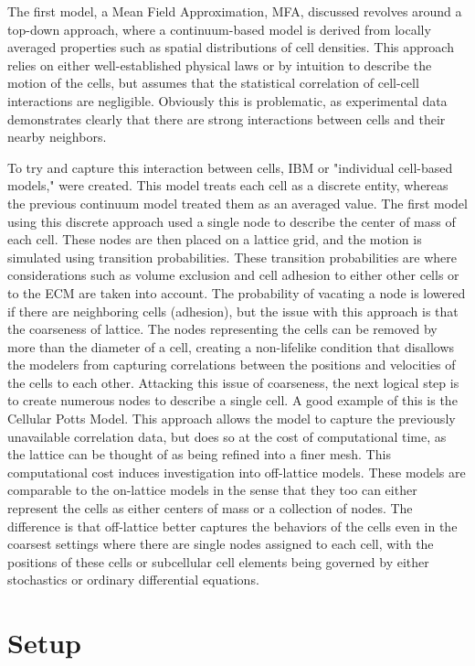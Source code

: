 \documentclass[12pt,letterpaper,cm]{article}
\renewcommand{\.}{\cdot}
\newcommand{\<}{\langle}
\renewcommand{\>}{\rangle}
\begin{document}
	The first model, a Mean Field Approximation, MFA, discussed revolves around a top-down approach, where a continuum-based model is derived from locally averaged properties such as spatial distributions of cell densities.  This approach relies on either well-established physical laws or by intuition to describe the motion of the cells, but assumes that the statistical correlation of cell-cell interactions are negligible.  Obviously this is problematic, as experimental data demonstrates clearly that there are strong interactions between cells and their nearby neighbors.  
	
	To try and capture this interaction between cells, IBM or "individual cell-based models," were created.  This model treats each cell as a discrete entity, whereas the previous continuum model treated them as an averaged value.  The first model using this discrete approach used a single node to describe the center of mass of each cell.  These nodes are then placed on a lattice grid, and the motion is simulated using transition probabilities.  These transition probabilities are where considerations such as volume exclusion and cell adhesion to either other cells or to the ECM are taken into account.  The probability of vacating a node is lowered if there are neighboring cells (adhesion), but the issue with this approach is that the coarseness of lattice.  The nodes representing the cells can be removed by more than the diameter of a cell, creating a non-lifelike condition that disallows the modelers from capturing correlations between the positions and velocities of the cells to each other.  Attacking this issue of coarseness, the next logical step is to create numerous nodes to describe a single cell.  A good example of this is the Cellular Potts Model.  This approach allows the model to capture the previously unavailable correlation data, but does so at the cost of computational time, as the lattice can be thought of as being refined into a finer mesh.  This computational cost induces investigation into off-lattice models.  These models are comparable to the on-lattice models in the sense that they too can either represent the cells as either centers of mass or a collection of nodes.  The difference is that off-lattice better captures the behaviors of the cells even in the coarsest settings where there are single nodes assigned to each cell, with the positions of these cells or subcellular cell elements being governed by either stochastics or ordinary differential equations.
	\section{Setup}
	
\end{document}
